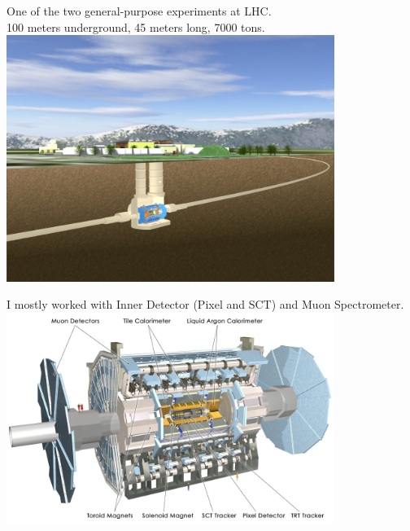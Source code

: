 {
\centering
One of the two general-purpose experiments at LHC.\\
100 meters underground, 45 meters long, 7000 tons. \\
\includegraphics[width=0.8\textwidth]{dates/mtg/figures/atlas/ATLASUG}

}

{
\centering
I mostly worked with Inner Detector (Pixel and SCT) and Muon Spectrometer. \\
\includegraphics[width=0.8\textwidth]{dates/mtg/figures/atlas/ATLAS}

}

